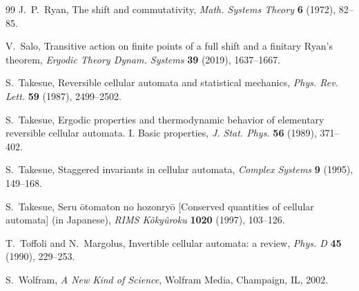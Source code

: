 \begin{thebibliography}{99}
 J.~P.~Ryan, The shift and commutativity, \emph{Math. Systems Theory} \textbf{6} (1972), 82--85.

 V.~Salo, Transitive action on finite points of a full shift and a finitary Ryan's theorem, \emph{Ergodic Theory Dynam. Systems} \textbf{39} (2019), 1637--1667.

 S.~Takesue, Reversible cellular automata and statistical mechanics, \emph{Phys. Rev. Lett.} \textbf{59} (1987), 2499--2502.

 S.~Takesue, Ergodic properties and thermodynamic behavior of elementary reversible cellular automata. I. Basic properties, \emph{J. Stat. Phys.} \textbf{56} (1989), 371--402.

 S.~Takesue, Staggered invariants in cellular automata, \emph{Complex Systems} \textbf{9} (1995), 149--168.

 S.~Takesue, Seru \=otomaton no hozonry\=o [Conserved quantities of cellular automata] (in Japanese), \emph{RIMS K\^oky\^uroku} \textbf{1020} (1997), 103--126.

 T.~Toffoli and N.~Margolus, Invertible cellular automata: a review, \emph{Phys. D} \textbf{45} (1990), 229--253.

 S.~Wolfram, \emph{A New Kind of Science}, Wolfram Media, Champaign, IL, 2002.

\end{thebibliography}
